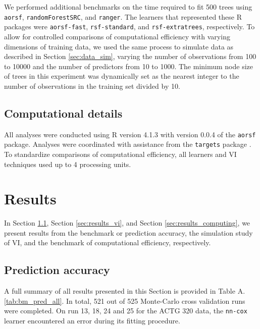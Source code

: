 \documentclass[12pt]{article}\usepackage[]{graphicx}\usepackage[]{xcolor}
\newcommand{\secref}[1]{Section \ref{#1}}
\newcommand{\tabrefAppendix}[1]{Table A.\ref{#1}}
\begin{document}
We performed additional benchmarks on the time required to fit 500 trees using \texttt{aorsf}, \texttt{randomForestSRC}, and \texttt{ranger}. The learners that represented these R packages were \texttt{aorsf-fast}, \texttt{rsf-standard}, and \texttt{rsf-extratrees}, respectively. To allow for controlled comparisons of computational efficiency with varying dimensions of training data, we used the same process to simulate data as described in \secref{sec:data_sim}, varying the number of observations from 100 to 10000 and the number of predictors from 10 to 1000. The minimum node size of trees in this experiment was dynamically set as the nearest integer to the number of observations in the training set divided by 10.

\subsection{Computational details} \label{sec:computing}

All analyses were conducted using R version 4.1.3 with version 0.0.4 of the \texttt{aorsf} \citep{jaeger2022aorsf} package. Analyses were coordinated with assistance from the \texttt{targets} package \citep{targets}. To standardize comparisons of computational efficiency, all learners and VI techniques used up to 4 processing units.


\section{Results} \label{sec:results}

In \secref{sec:results_pred}, \secref{sec:results_vi}, and \secref{sec:results_computing}, we present results from the benchmark or prediction accuracy, the simulation study of VI, and the benchmark of computational efficiency, respectively.

\subsection{Prediction accuracy} \label{sec:results_pred}

A full summary of all results presented in this Section is provided in \tabrefAppendix{tab:bm_pred_all}. In total, 521 out of 525 Monte-Carlo cross validation runs were completed. On run 13, 18, 24 and 25 for the ACTG 320 data, the \texttt{nn-cox} learner encountered an error during its fitting procedure.
\end{document}
